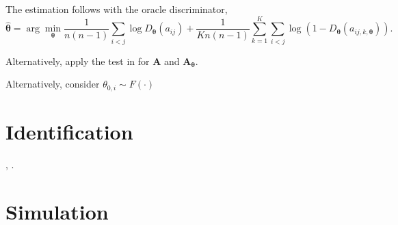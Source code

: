 The estimation follows \citet[KMP]{kaji/manresa/pouliot:2022:adversarial_est} with the oracle discriminator,
\[
    \hat{\bm{\theta }} = \arg\min_{\bm{\theta}} \frac{1}{n \left( n-1 \right) } \sum_{i < j} \log D_{\bm{\theta }} \left( a_{ij}  \right) +  \frac{1}{K n \left( n-1 \right) } \sum_{k=1}^{K} \sum_{i < j} \log  \left( 1 - D_{\bm{\theta}} \left( a_{ij, k, \bm{\theta}} \right)  \right).
\]









\begin{remark}
    Alternatively, apply the test in \citet{auerbach:2022:testdiffnetwork} for \(\bm{A}\) and \(\bm{A}_{\bm{\theta}}\). 
\end{remark}

\begin{remark}
    Alternatively, consider \(\theta _{0, i} \sim F \left( \cdot \right)  \) 
\end{remark}

\section{Identification}

\citet{chatterjee/diaconis/sly:2011:randomgraph}, \citet{gao:2020:identification}.


\section{Simulation}


